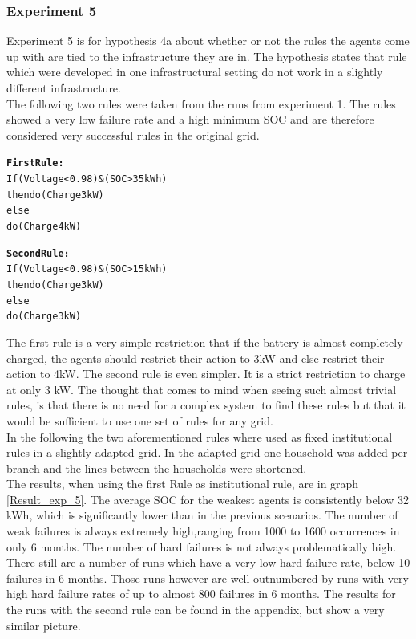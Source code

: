 \documentclass[a4paper]{article}
\begin{document}
\subsubsection{Experiment 5}
Experiment 5 is for hypothesis 4a about whether or not the rules the agents come up with are tied to the infrastructure they are in. 
The hypothesis states that rule which were developed in one infrastructural setting do not work in a slightly different infrastructure.\\
The following  two rules were taken from the runs from experiment 1. The rules showed a very low failure rate and a high minimum SOC and 
are therefore considered very successful rules in the original grid.\\
\begin{alltt}
\textbf{First Rule:}
If (Voltage < 0.98) & (SOC > 35 kWh)
    then do (Charge 3 kW)
else 
    do  (Charge 4kW)

\textbf{Second Rule:}
If (Voltage < 0.98) & (SOC > 15 kWh)
    then do (Charge 3 kW)
else 
    do  (Charge 3kW)
\end{alltt}
The first rule is a very simple restriction that if the battery is almost completely charged, the agents should restrict their action to 
3kW and else restrict their action to 4kW. The second rule is even simpler. It is a strict restriction to charge at only 3 kW. The thought 
that comes to mind when seeing such almost trivial rules, is that there is no need for a complex system to find these rules but that it 
would be sufficient to use one set of rules for any grid.\\
In the following the two aforementioned rules where used as fixed institutional rules in a slightly adapted grid. In the adapted grid 
one household was added per branch and the lines between the households were shortened. \\
The results, when using the first Rule as institutional rule,  are in graph \ref{Result_exp_5}. The average SOC for the weakest agents 
is consistently below 32 kWh, which is significantly lower than in the previous scenarios. The number of weak failures is always 
extremely high,ranging from 1000 to 1600 occurrences in only 6 months. 
The number of hard failures is not always problematically high. There still are a number of runs which have a very low hard 
failure rate, below 10 failures in 6 months. Those runs however are well outnumbered by runs with very high hard failure rates of up to 
almost 800 failures in 6 months.
The results for the runs with the second rule can be found in the appendix, but show a very similar picture.  
\end{document}
